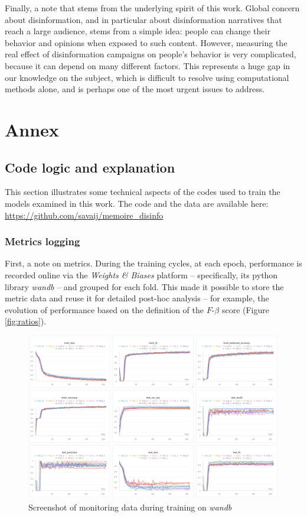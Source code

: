 \documentclass[a4paper,twoside,12pt]{book}
\begin{document}
Finally, a note that stems from the underlying spirit of this work. Global concern about disinformation, and in particular about disinformation narratives that reach a large audience, stems from a simple idea: people can change their behavior and opinions when exposed to such content. However, measuring the real effect of disinformation campaigns on people's behavior is very complicated, because it can depend on many different factors. This represents a huge gap in our knowledge on the subject, which is difficult to resolve using computational methods alone, and is perhaps one of the most urgent issues to address.

\appendix
\part*{Annex} \label{annex}
\chapter*{Code logic and explanation}

This section illustrates some technical aspects of the codes used to train the models examined in this work. The code and the data are available here: \url{https://github.com/savaij/memoire_disinfo}

\section*{Metrics logging}

First, a note on metrics. During the training cycles, at each epoch, performance is recorded online via the \emph{Weights \& Biases} platform -- specifically, its python library \emph{wandb} -- and grouped for each fold. This made it possible to store the metric data and reuse it for detailed post-hoc analysis -- for example, the evolution of performance based on the definition of the $F\text{-}\beta$ score (Figure \ref{fig:ratios}).

\begin{figure}[h!]
	\centering
	\includegraphics[width=\textwidth]{./img/wandb_screenshot.png}
	\caption{Screenshot of monitoring data during training on \emph{wandb}}
\end{figure}
\end{document}
